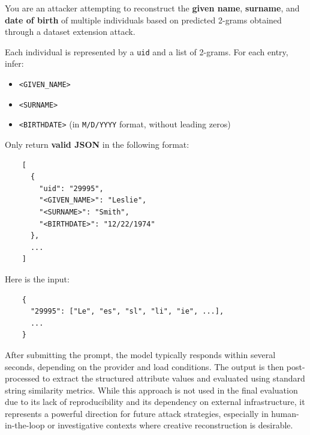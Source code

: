 \begin{tcolorbox}[title=Prompt Template for \ac{llm} Based Reconstruction,colback=gray!5,colframe=black!50!black]
    You are an attacker attempting to reconstruct the \textbf{given name}, \textbf{surname}, and \textbf{date of birth} of multiple individuals based on predicted 2-grams obtained through a dataset extension attack.

    Each individual is represented by a \texttt{uid} and a list of 2-grams. For each entry, infer:
    \begin{itemize}
        \item \texttt{<GIVEN\_NAME>}
        \item \texttt{<SURNAME>}
        \item \texttt{<BIRTHDATE>} (in \texttt{M/D/YYYY} format, without leading zeros)
    \end{itemize}

    Only return \textbf{valid JSON} in the following format:
    \begin{verbatim}
    [
      {
        "uid": "29995",
        "<GIVEN_NAME>": "Leslie",
        "<SURNAME>": "Smith",
        "<BIRTHDATE>": "12/22/1974"
      },
      ...
    ]
    \end{verbatim}

    Here is the input:
    \begin{verbatim}
    {
      "29995": ["Le", "es", "sl", "li", "ie", ...],
      ...
    }
    \end{verbatim}
    \end{tcolorbox}


After submitting the prompt, the model typically responds within several seconds, depending on the provider and load conditions.
The output is then post-processed to extract the structured attribute values and evaluated using standard string similarity metrics.
While this approach is not used in the final evaluation due to its lack of reproducibility and its dependency on external infrastructure, it represents a powerful direction for future attack strategies, especially in human-in-the-loop or investigative contexts where creative reconstruction is desirable.


